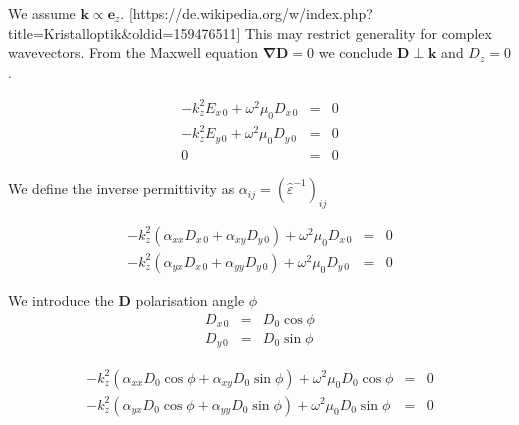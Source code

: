 \documentclass[12pt,a4paper,twoside,openright,BCOR10mm,headsepline,titlepage,abstracton,chapterprefix,final]{scrreprt}
\newcommand\Vector[1]{{\mathbf{#1}}}
\newcommand\wavenumber{k}
\newcommand\Wavevector{\Vector{\wavenumber}}
\newcommand\Nabla{\Vector{\nabla}}
\newcommand\Tensor[1]{\hat{#1}}
\newcommand\scalarDfield{D}
\newcommand\Dfield{\Vector{\scalarDfield}}
\newcommand\permittivity{\Tensor{\scalarpermittivity}}
\newcommand\scalarpermittivity{\varepsilon}
\begin{document}
We assume $\Wavevector \propto \Vector{e}_z$. [https://de.wikipedia.org/w/index.php?title=Kristalloptik\&oldid=159476511]
This may restrict generality for complex wavevectors.
From the Maxwell equation $\Nabla \Dfield = 0$ we conclude $\Dfield \perp \Wavevector$ and $\scalarDfield_z=0$.

\begin{eqnarray}
 - \wavenumber_z^2 E_{x\,0} + \omega^2 \mu_0 \scalarDfield_{x\,0} &=& 0\\ 
 - \wavenumber_z^2 E_{y\,0} + \omega^2 \mu_0 \scalarDfield_{y\,0} &=& 0\\
 0 &=& 0
\end{eqnarray}

We define the inverse permittivity as $\alpha_{ij} = (\permittivity^{-1})_{ij}$

\begin{eqnarray}
 - \wavenumber_z^2 (\alpha_{xx} \scalarDfield_{x\,0} + \alpha_{xy} \scalarDfield_{y\,0}) + \omega^2 \mu_0 \scalarDfield_{x\,0} &=& 0\\ 
 - \wavenumber_z^2 (\alpha_{yx} \scalarDfield_{x\,0} + \alpha_{yy} \scalarDfield_{y\,0}) + \omega^2 \mu_0 \scalarDfield_{y\,0} &=& 0
\end{eqnarray}

We introduce the $\Dfield$ polarisation angle $\phi$
\begin{eqnarray}
 \scalarDfield_{x\,0} &=& \scalarDfield_{0} \cos \phi \\
 \scalarDfield_{y\,0} &=& \scalarDfield_{0} \sin \phi
\end{eqnarray}

\begin{eqnarray}
 - \wavenumber_z^2 (\alpha_{xx} \scalarDfield_{0} \cos \phi + \alpha_{xy} \scalarDfield_{0} \sin \phi) + \omega^2 \mu_0 \scalarDfield_{0} \cos \phi &=& 0\\ 
 - \wavenumber_z^2 (\alpha_{yx} \scalarDfield_{0} \cos \phi + \alpha_{yy} \scalarDfield_{0} \sin \phi) + \omega^2 \mu_0 \scalarDfield_{0} \sin \phi &=& 0
\end{eqnarray}
\end{document}
